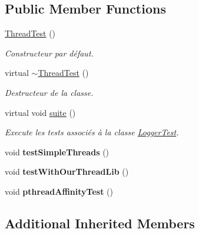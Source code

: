 \subsection*{Public Member Functions}
\begin{DoxyCompactItemize}
\item 
\mbox{\label{classtest_1_1ThreadTest_ace7db12cdcf21715dafb31cef96f1afc}} 
\hyperlink{classtest_1_1ThreadTest_ace7db12cdcf21715dafb31cef96f1afc}{Thread\+Test} ()
\begin{DoxyCompactList}\small\item\em Constructeur par défaut. \end{DoxyCompactList}\item 
\mbox{\label{classtest_1_1ThreadTest_a2dd8369687aece094ac56f9fc5d6a5f3}} 
virtual \hyperlink{classtest_1_1ThreadTest_a2dd8369687aece094ac56f9fc5d6a5f3}{$\sim$\+Thread\+Test} ()
\begin{DoxyCompactList}\small\item\em Destructeur de la classe. \end{DoxyCompactList}\item 
\mbox{\label{classtest_1_1ThreadTest_a093bd2c8777b2758815bd6e7d5023f65}} 
virtual void \hyperlink{classtest_1_1ThreadTest_a093bd2c8777b2758815bd6e7d5023f65}{suite} ()
\begin{DoxyCompactList}\small\item\em Execute les tests associés à la classe \hyperlink{classtest_1_1LoggerTest}{Logger\+Test}. \end{DoxyCompactList}\item 
\mbox{\label{classtest_1_1ThreadTest_a9d65361fd1c5e087075207647f49dbcc}} 
void {\bfseries test\+Simple\+Threads} ()
\item 
\mbox{\label{classtest_1_1ThreadTest_a083f41ec68db90305a06cb6eb430b21d}} 
void {\bfseries test\+With\+Our\+Thread\+Lib} ()
\item 
\mbox{\label{classtest_1_1ThreadTest_a45b2bd2576932b3e94e13f6f956a4bee}} 
void {\bfseries pthread\+Affinity\+Test} ()
\end{DoxyCompactItemize}
\subsection*{Additional Inherited Members}


